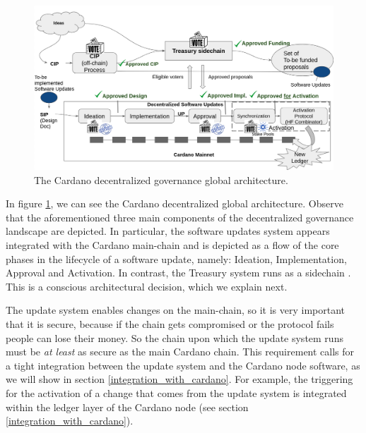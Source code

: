 \begin{figure}[h!] %
	\centering
	\includegraphics[width=0.8\columnwidth,
	keepaspectratio]{figures/cardano_dec_gov_landscape.png}
	\caption{The Cardano decentralized governance global architecture.}
	\label{fig:cardano_global_architecture}
\end{figure}

In figure \ref{fig:cardano_global_architecture}, we can see the Cardano
decentralized global architecture. Observe that the aforementioned three main
components of the decentralized governance landscape are depicted. In
particular, the software updates system appears integrated with the Cardano
main-chain and is depicted as a flow of the core phases in the lifecycle of a
software update, namely: Ideation, Implementation, Approval and Activation. In
contrast, the Treasury system runs as a sidechain \cite{sidechain}. This is a
conscious architectural decision, which we explain next.

The update system enables changes on the main-chain, so it is very important
that it is secure, because if the chain gets compromised or the protocol fails
people can lose their money. So the chain upon which the update system runs
must be \emph{at least} as secure as the main Cardano chain. This requirement
calls for a tight integration between the update system and the Cardano node
software, as we will show in section \ref{integration_with_cardano}. For
example,
the triggering for the activation of a change that comes from the update system
is integrated within the ledger layer of the Cardano node (see section
\ref{integration_with_cardano}).

